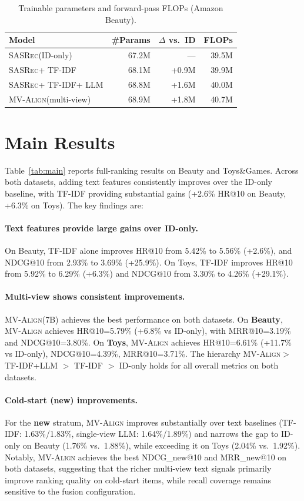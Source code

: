 \documentclass[sigconf,natbib=true,anonymous]{acmart}
\newcommand{\model}{\textsc{MV-Align}\xspace}
\newcommand{\base}{\textsc{SASRec}\xspace}
\newcommand{\tfidf}{\textsc{TF-IDF}\xspace}
\newcommand{\llm}{\textsc{LLM}\xspace}
\begin{document}
\begin{table}[h]
\caption{Trainable parameters and forward-pass FLOPs (Amazon Beauty).}
\label{tab:params}
\centering
\small
\begin{tabular}{lrrr}
\toprule
\textbf{Model} & \textbf{\#Params} & \textbf{$\Delta$ vs.\ ID} & \textbf{FLOPs} \\
\midrule
\base (ID-only) & 67.2M & --- & 39.5M \\
\base + \tfidf & 68.1M & +0.9M & 39.9M \\
\base + \tfidf + \llm & 68.8M & +1.6M & 40.0M \\
\model (multi-view) & 68.9M & +1.8M & 40.7M \\
\bottomrule
\end{tabular}
\end{table}

\section{Main Results}\label{sec:main_results}
Table~\ref{tab:main} reports full-ranking results on Beauty
and Toys\&Games. Across both datasets, adding text features
consistently improves over the ID-only baseline, with \tfidf
providing substantial gains (+2.6\% HR@10 on Beauty, +6.3\%
on Toys). The key findings are:

\paragraph{Text features provide large gains over ID-only.}
On Beauty, \tfidf alone improves HR@10 from 5.42\% to 5.56\%
(+2.6\%), and NDCG@10 from 2.93\% to 3.69\% (+25.9\%). On
Toys, \tfidf improves HR@10 from 5.92\% to 6.29\% (+6.3\%)
and NDCG@10 from 3.30\% to 4.26\% (+29.1\%).


\paragraph{Multi-view shows consistent improvements.}
\model (7B) achieves the best performance on both datasets.
On \textbf{Beauty}, \model achieves HR@10=5.79\% (+6.8\% vs
ID-only), with MRR@10=3.19\% and NDCG@10=3.80\%. On
\textbf{Toys}, \model achieves HR@10=6.61\% (+11.7\% vs
ID-only), NDCG@10=4.39\%, MRR@10=3.71\%. The hierarchy
\model $>$ TF-IDF+LLM $>$ TF-IDF $>$ ID-only holds for all
overall metrics on both datasets.

\paragraph{Cold-start (new) improvements.}
For the \textbf{new} stratum, \model improves substantially
over text baselines (\tfidf: 1.63\%/1.83\%, single-view \llm:
1.64\%/1.89\%) and narrows the gap to ID-only on Beauty
(1.76\% vs.\ 1.88\%), while exceeding it on Toys (2.04\%
vs.\ 1.92\%). Notably, \model achieves the best NDCG\_new@10
and MRR\_new@10 on both datasets, suggesting that the richer
multi-view text signals primarily improve ranking quality on
cold-start items, while recall coverage remains sensitive to
the fusion configuration.
\end{document}
